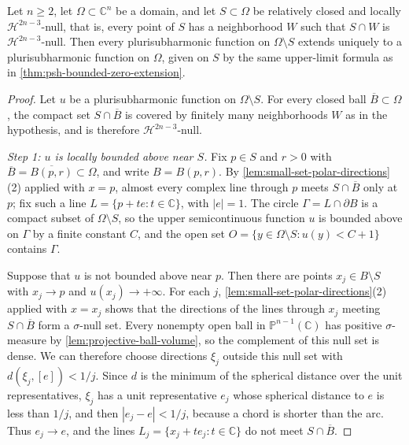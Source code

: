 \begin{theorem}\label{thm:psh-small-set-extension}
Let $n\ge2$, let $\Omega\subset\mathbb{C}^n$ be a domain, and let $S\subset\Omega$ be relatively closed and locally $\mathcal H^{2n-3}$-null, that is, every point of $S$ has a neighborhood $W$ such that $S\cap W$ is $\mathcal H^{2n-3}$-null. Then every plurisubharmonic function on $\Omega\setminus S$ extends uniquely to a plurisubharmonic function on $\Omega$, given on $S$ by the same upper-limit formula as in \cref{thm:psh-bounded-zero-extension}.
\end{theorem}
\begin{proof}
Let $u$ be a plurisubharmonic function on $\Omega\setminus S$. For every closed ball $\overline B\subset\Omega$, the compact set $S\cap\overline B$ is covered by finitely many neighborhoods $W$ as in the hypothesis, and is therefore $\mathcal H^{2n-3}$-null.

\emph{Step 1: $u$ is locally bounded above near $S$.} Fix $p\in S$ and $r>0$ with $\overline B=\overline{B(p,r)}\subset\Omega$, and write $B=B(p,r)$. By \cref{lem:small-set-polar-directions}(2) applied with $x=p$, almost every complex line through $p$ meets $S\cap\overline B$ only at $p$; fix such a line $L=\{p+te:t\in\mathbb{C}\}$, with $|e|=1$. The circle $\Gamma=L\cap\partial B$ is a compact subset of $\Omega\setminus S$, so the upper semicontinuous function $u$ is bounded above on $\Gamma$ by a finite constant $C$, and the open set $O=\{y\in\Omega\setminus S:u(y)<C+1\}$ contains $\Gamma$.

Suppose that $u$ is not bounded above near $p$. Then there are points $x_j\in B\setminus S$ with $x_j\to p$ and $u(x_j)\to+\infty$. For each $j$, \cref{lem:small-set-polar-directions}(2) applied with $x=x_j$ shows that the directions of the lines through $x_j$ meeting $S\cap\overline B$ form a $\sigma$-null set. Every nonempty open ball in $\mathbb P^{n-1}(\mathbb C)$ has positive $\sigma$-measure by \cref{lem:projective-ball-volume}, so the complement of this null set is dense. We can therefore choose directions $\xi_j$ outside this null set with $d(\xi_j,[e])<1/j$. Since $d$ is the minimum of the spherical distance over the unit representatives, $\xi_j$ has a unit representative $e_j$ whose spherical distance to $e$ is less than $1/j$, and then $|e_j-e|<1/j$, because a chord is shorter than the arc. Thus $e_j\to e$, and the lines $L_j=\{x_j+te_j:t\in\mathbb{C}\}$ do not meet $S\cap\overline B$.


\end{proof}
